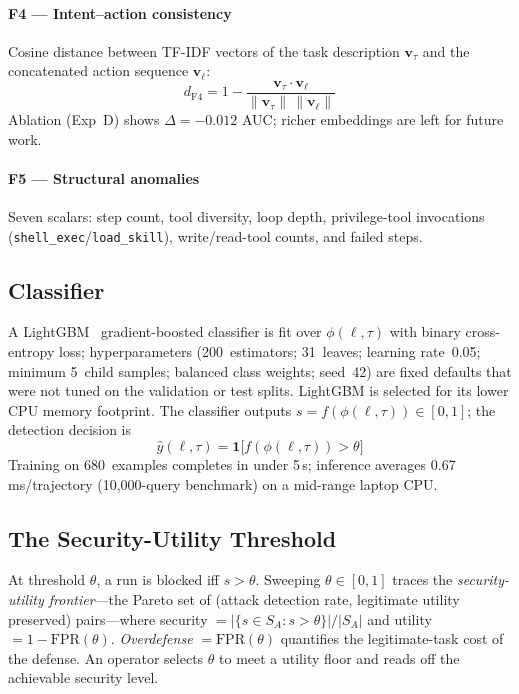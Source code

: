 \documentclass[conference]{IEEEtran}
\begin{document}
\paragraph{F4 --- Intent--action consistency}
Cosine distance between TF-IDF vectors of the task description
$\mathbf{v}_\tau$ and the concatenated action sequence $\mathbf{v}_\ell$:
\[d_{\mathrm{F4}} = 1 - \frac{\mathbf{v}_\tau\cdot\mathbf{v}_\ell}{\|\mathbf{v}_\tau\|\,\|\mathbf{v}_\ell\|}\]
Ablation (Exp~D) shows $\Delta{=}{-}0.012$ AUC; richer embeddings
are left for future work.

\paragraph{F5 --- Structural anomalies}
Seven scalars: step count, tool diversity, loop depth,
privilege-tool invocations (\texttt{shell\_exec}/\texttt{load\_skill}),
write/read-tool counts, and failed steps.

\subsection{Classifier}

A LightGBM~\cite{ke2017lightgbm} gradient-boosted classifier is fit
over $\phi(\ell,\tau)$ with binary cross-entropy loss; hyperparameters
(200~estimators; 31~leaves; learning rate~0.05; minimum 5~child
samples; balanced class weights; seed~42) are fixed defaults that
were not tuned on the validation or test splits.
LightGBM is selected for its lower CPU memory footprint.  The
classifier outputs $s{=}f(\phi(\ell,\tau))\in[0,1]$; the detection
decision is
\[\hat{y}(\ell,\tau)=\mathbf{1}\bigl[f(\phi(\ell,\tau))>\theta\bigr]\]
Training on 680~examples completes in under 5\,s; inference averages
0.67\,ms/trajectory (10{,}000-query benchmark) on a mid-range laptop CPU.

\subsection{The Security-Utility Threshold}
\label{sec:threshold}

At threshold $\theta$, a run is blocked iff $s > \theta$.  Sweeping
$\theta \in [0,1]$ traces the \emph{security-utility frontier}---the
Pareto set of (attack detection rate, legitimate utility preserved)
pairs---where security $= |\{s \!\in\! S_A : s > \theta\}|/|S_A|$
and utility $= 1 - \mathrm{FPR}(\theta)$.  \emph{Overdefense}
$= \mathrm{FPR}(\theta)$ quantifies the legitimate-task cost of the
defense.  An operator selects $\theta$ to meet a utility floor and
reads off the achievable security level.
\end{document}
